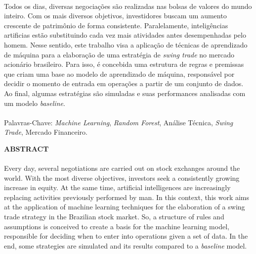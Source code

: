 \paragraph{} Todos os dias, diversas negociações são realizadas nas bolsas de valores do mundo inteiro. Com os mais diversos objetivos, investidores buscam um aumento crescente de patrimônio de forma consistente. Paralelamente, inteligências artificias estão substituindo cada vez mais atividades antes desempenhadas pelo homem. Nesse sentido, este trabalho visa a aplicação de técnicas de aprendizado de máquina para a elaboração de uma estratégia de \textit{swing trade} no mercado acionário brasileiro. Para isso, é concebida uma estrutura de regras e premissas que criam uma base ao modelo de aprendizado de máquina, responsável por decidir o momento de entrada em operações a partir de um conjunto de dados. Ao final, algumas estratégias são simuladas e suas performances analisadas com um modelo \textit{baseline}.

\paragraph{}
\noindent Palavras-Chave: \textit{Machine Learning}, \textit{Random Forest}, Análise Técnica, \textit{Swing Trade}, Mercado Financeiro.

\pagebreak


\begin{center}
\textbf{ABSTRACT}
\end{center}
      \vspace{0.5cm}

\paragraph{} Every day, several negotiations are carried out on stock exchanges around the world. With the most diverse objectives, investors seek a consistently growing increase in equity. At the same time, artificial intelligences are increasingly replacing activities previously performed by man. In this context, this work aims at the application of machine learning techniques for the elaboration of a swing trade strategy in the Brazilian stock market. So, a structure of rules and assumptions is conceived to create a basis for the machine learning model, responsible for deciding when to enter into operations given a set of data. In the end, some strategies are simulated and its results compared to a \textit{baseline} model.

